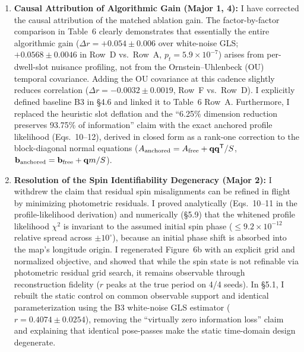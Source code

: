 \documentclass[11pt]{article}
\begin{document}
\begin{enumerate}
    \item \textbf{Causal Attribution of Algorithmic Gain (Major 1, 4):}
    I have corrected the causal attribution of the matched ablation gain. The factor-by-factor comparison in Table~6 clearly demonstrates that essentially the entire algorithmic gain ($\Delta r = +0.054 \pm 0.006$ over white-noise GLS; $+0.0568 \pm 0.0046$ in Row~D vs.\ Row~A, $p_t = 5.9\times10^{-7}$) arises from per-dwell-slot nuisance profiling, not from the Ornstein--Uhlenbeck (OU) temporal covariance. Adding the OU covariance at this cadence slightly reduces correlation ($\Delta r = -0.0032 \pm 0.0019$, Row~F vs.\ Row~D). I explicitly defined baseline B3 in §4.6 and linked it to Table~6 Row~A. Furthermore, I replaced the heuristic slot deflation and the ``6.25\% dimension reduction preserves 93.75\% of information'' claim with the exact anchored profile likelihood (Eqs.~10--12), derived in closed form as a rank-one correction to the block-diagonal normal equations ($A_{\rm anchored} = A_{\rm free} + \mathbf{q}\mathbf{q}^{\sf T}/S$, $\mathbf{b}_{\rm anchored} = \mathbf{b}_{\rm free} + \mathbf{q}m/S$).

    \item \textbf{Resolution of the Spin Identifiability Degeneracy (Major 2):}
    I withdrew the claim that residual spin misalignments can be refined in flight by minimizing photometric residuals. I proved analytically (Eqs.~10--11 in the profile-likelihood derivation) and numerically (§5.9) that the whitened profile likelihood $\chi^2$ is invariant to the assumed initial spin phase ($\le 9.2\times 10^{-12}$ relative spread across $\pm 10^\circ$), because an initial phase shift is absorbed into the map's longitude origin. I regenerated Figure~6b with an explicit grid and normalized objective, and showed that while the spin state is not refinable via photometric residual grid search, it remains observable through reconstruction fidelity ($r$ peaks at the true period on 4/4 seeds). In §5.1, I rebuilt the static control on common observable support and identical parameterization using the B3 white-noise GLS estimator ($r = 0.4074 \pm 0.0254$), removing the ``virtually zero information loss'' claim and explaining that identical pose-passes make the static time-domain design degenerate.


\end{enumerate}
\end{document}
